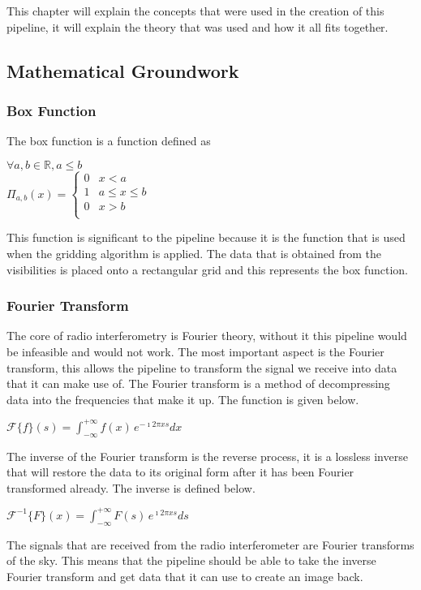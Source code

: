 This chapter will explain the concepts that were used in the creation of this pipeline, it will explain the theory that was used and how it all fits together.

\subsection{Mathematical Groundwork}
\subsubsection{Box Function}
The box function is a function defined as \\ 
\begin{center}
$\forall a,b \in \mathbb{R}, a \le b$\\
$
\Pi_{a,b}(x) 
=\begin{cases} 
      0 &  x < a \\
      1 & a \le x \le b \\
      0 & x > b \\
   \end{cases}$
\end{center}
This function is significant to the pipeline because it is the function that is used when the gridding algorithm is applied. The data that is obtained from the visibilities is placed onto a rectangular grid and this represents the box function.
\subsubsection{Fourier Transform}
The core of radio interferometry is Fourier theory, without it this pipeline would be infeasible and would not work. The most important aspect is the Fourier transform, this allows the pipeline to transform the signal we receive into data that it can make use of. The Fourier transform is a method of decompressing data into the frequencies that make it up. The function is given below.
\begin{center}
$\mathscr{F}\{f\}(s) = \int_{-\infty}^{+\infty}f(x)\,e^{-\imath 2\pi xs}dx$    
\end{center}
The inverse of the Fourier transform is the reverse process, it is a lossless inverse that will restore the data to its original form after it has been Fourier transformed already. The inverse is defined below.
\begin{center}
$\mathscr{F}^{-1}\{F\}(x) = \int_{-\infty}^{+\infty}F(s)\,e^{\imath 2\pi xs}ds$
\end{center}
The signals that are received from the radio interferometer are Fourier transforms of the sky. This means that the pipeline should be able to take the inverse Fourier transform and get data that it can use to create an image back.

